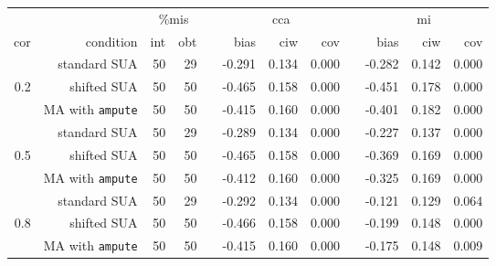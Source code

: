 \documentclass[]{interact}
\newcommand{\code}[1]{\texttt{#1}}
\begin{document}
\begin{table}
{\begin{tabular}{rrrrrrrrrrrr}
\hline
&& \multicolumn{2}{c}{\%mis} && \multicolumn{3}{c}{cca} && \multicolumn{3}{c}{mi} \\
\cline{3-4} \cline{6-8} \cline{10-12}
cor & condition & int & obt & & bias & ciw & cov & & bias & ciw & cov \\ 
\hline
 & standard SUA & 50 & 29 &  & -0.291 & 0.134 & 0.000 &  & -0.282 & 0.142 & 0.000 \\ 
  0.2 & shifted SUA & 50 & 50 &  & -0.465 & 0.158 & 0.000 &  & -0.451 & 0.178 & 0.000 \\ 
   & MA with \code{ampute} & 50 & 50 &  & -0.415 & 0.160 & 0.000 &  & -0.401 & 0.182 & 0.000 \\ 
   \cline{2-12}
   & standard SUA & 50 & 29 &  & -0.289 & 0.134 & 0.000 &  & -0.227 & 0.137 & 0.000 \\ 
  0.5 & shifted SUA & 50 & 50 &  & -0.465 & 0.158 & 0.000 &  & -0.369 & 0.169 & 0.000 \\ 
   & MA with \code{ampute} & 50 & 50 &  & -0.412 & 0.160 & 0.000 &  & -0.325 & 0.169 & 0.000 \\ 
   \cline{2-12}
   & standard SUA & 50 & 29 &  & -0.292 & 0.134 & 0.000 &  & -0.121 & 0.129 & 0.064 \\ 
  0.8 & shifted SUA & 50 & 50 &  & -0.466 & 0.158 & 0.000 &  & -0.199 & 0.148 & 0.000 \\ 
   & MA with \code{ampute} & 50 & 50 &  & -0.415 & 0.160 & 0.000 &  & -0.175 & 0.148 & 0.009 \\ 
   \hline
\end{tabular}}
  \label{sim2b}
  \end{table}
  
\end{document}
